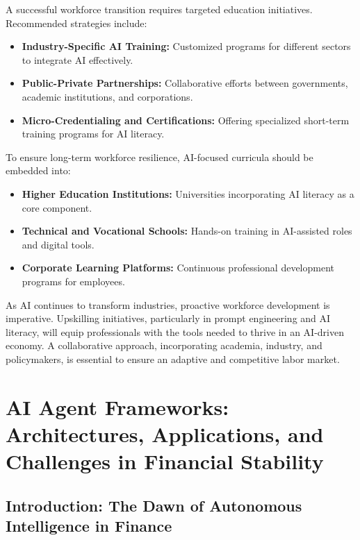 \documentclass[a4paper,headinclude=on,footinclude=on,12pt,oneside]{scrbook}
\begin{document}
A successful workforce transition requires targeted education initiatives. Recommended strategies include:
\begin{itemize}
	\item \textbf{Industry-Specific AI Training:} Customized programs for different sectors to integrate AI effectively.
	\item \textbf{Public-Private Partnerships:} Collaborative efforts between governments, academic institutions, and corporations.
	\item \textbf{Micro-Credentialing and Certifications:} Offering specialized short-term training programs for AI literacy.
\end{itemize}


To ensure long-term workforce resilience, AI-focused curricula should be embedded into:
\begin{itemize}
	\item \textbf{Higher Education Institutions:} Universities incorporating AI literacy as a core component.
	\item \textbf{Technical and Vocational Schools:} Hands-on training in AI-assisted roles and digital tools.
	\item \textbf{Corporate Learning Platforms:} Continuous professional development programs for employees.
\end{itemize}


As AI continues to transform industries, proactive workforce development is imperative. Upskilling initiatives, particularly in prompt engineering and AI literacy, will equip professionals with the tools needed to thrive in an AI-driven economy. A collaborative approach, incorporating academia, industry, and policymakers, is essential to ensure an adaptive and competitive labor market.
%

\chapter{AI Agent Frameworks: Architectures, Applications, and Challenges in Financial Stability}

\section*{Introduction: The Dawn of Autonomous Intelligence in Finance}
\end{document}
